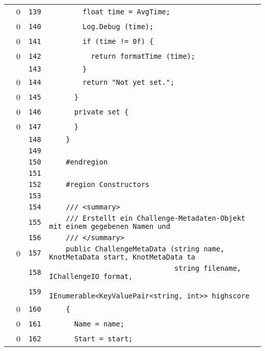 \documentclass[a4paper,10pt]{article}
\begin{document}
\begin{longtable}[l]{lrrl}
\cellcolor{red} & 0 & \verb~139~ & \verb~        float time = AvgTime;~\\
\cellcolor{red} & 0 & \verb~140~ & \verb~        Log.Debug (time);~\\
\cellcolor{red} & 0 & \verb~141~ & \verb~        if (time != 0f) {~\\
\cellcolor{red} & 0 & \verb~142~ & \verb~          return formatTime (time);~\\
\cellcolor{gray} &  & \verb~143~ & \verb~        }~\\
\cellcolor{red} & 0 & \verb~144~ & \verb~        return "Not yet set.";~\\
\cellcolor{red} & 0 & \verb~145~ & \verb~      }~\\
\cellcolor{red} & 0 & \verb~146~ & \verb~      private set {~\\
\cellcolor{red} & 0 & \verb~147~ & \verb~      }~\\
\cellcolor{gray} &  & \verb~148~ & \verb~    }~\\
\cellcolor{gray} &  & \verb~149~ & \verb~~\\
\cellcolor{gray} &  & \verb~150~ & \verb~    #endregion~\\
\cellcolor{gray} &  & \verb~151~ & \verb~~\\
\cellcolor{gray} &  & \verb~152~ & \verb~    #region Constructors~\\
\cellcolor{gray} &  & \verb~153~ & \verb~~\\
\cellcolor{gray} &  & \verb~154~ & \verb~    /// <summary>~\\
\cellcolor{gray} &  & \verb~155~ & \verb~    /// Erstellt ein Challenge-Metadaten-Objekt mit einem gegebenen Namen und ~\\
\cellcolor{gray} &  & \verb~156~ & \verb~    /// </summary>~\\
\cellcolor{red} & 0 & \verb~157~ & \verb~    public ChallengeMetaData (string name, KnotMetaData start, KnotMetaData ta~\\
\cellcolor{gray} &  & \verb~158~ & \verb~                              string filename, IChallengeIO format,~\\
\cellcolor{gray} &  & \verb~159~ & \verb~                              IEnumerable<KeyValuePair<string, int>> highscore~\\
\cellcolor{red} & 0 & \verb~160~ & \verb~    {~\\
\cellcolor{red} & 0 & \verb~161~ & \verb~      Name = name;~\\
\cellcolor{red} & 0 & \verb~162~ & \verb~      Start = start;~\\

\end{longtable}
\end{document}

